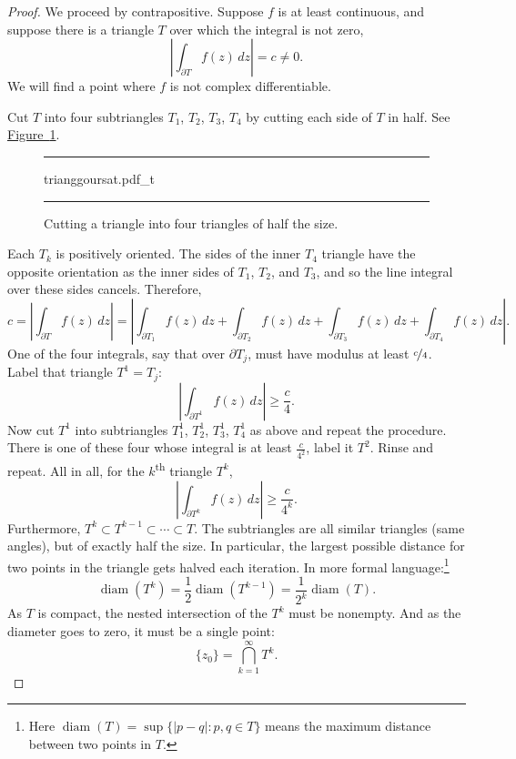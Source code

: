 \documentclass[12pt,openany]{book}
\newcommand{\sabs}[1]{\lvert {#1} \rvert}
\newcommand{\abs}[1]{\left\lvert {#1} \right\rvert}
\theoremstyle{plain}
\theoremstyle{remark}
\theoremstyle{definition}
\newenvironment{myfig}{%
\begin{figure}[h!t]
\noindent\rule{\textwidth}{0.5pt}\vspace{12pt}\par\centering}%
{\par\noindent\rule{\textwidth}{0.5pt}
\end{figure}}
\theoremstyle{exercise}
\theoremstyle{example}
\newcommand{\figureref}[1]{\hyperref[#1]{Figure~\ref*{#1}}}
\begin{document}
\begin{proof}
We proceed by contrapositive.
Suppose $f$ is at least continuous, and 
suppose there is a triangle $T$ over which the integral is not zero,
\begin{equation*}
\abs{\int_{\partial T} f(z) \, dz} = c \not= 0 .
\end{equation*}
We will find a point
where $f$ is not complex differentiable.

Cut $T$ into four subtriangles
$T_1$, $T_2$, $T_3$, $T_4$ by cutting each side of $T$ in half.  See
\figureref{fig:trianggoursat}.
\begin{myfig}
{trianggoursat.pdf_t}
\caption{Cutting a triangle into four triangles of half the size.%
\label{fig:trianggoursat}}
\end{myfig}

Each $T_k$ is positively oriented.
The sides of the inner $T_4$ triangle have the opposite
orientation as the inner sides of $T_1$, $T_2$, and $T_3$, and
so the line integral over these sides cancels.  Therefore,
\begin{equation*}
c = 
\abs{\int_{\partial T} f(z) \, dz }
=
\abs{\int_{\partial T_1} f(z) \, dz 
+
\int_{\partial T_2} f(z) \, dz 
+
\int_{\partial T_3} f(z) \, dz 
+
\int_{\partial T_4} f(z) \, dz } .
\end{equation*}
One of the four integrals, say that over $\partial T_j$,
must have modulus at least $\nicefrac{c}{4}$.  Label
that triangle $T^1 = T_j$:
\begin{equation*}
\abs{\int_{\partial T^1} f(z) \, dz } \geq \frac{c}{4} .
\end{equation*}
Now cut $T^1$ into subtriangles
$T_1^1$, $T_2^1$, $T_3^1$, $T_4^1$ as above and repeat the procedure.  There
is one of these four whose integral is at least $\frac{c}{4^2}$, label it
$T^2$.  Rinse and repeat.
All in all, for the $k$\textsuperscript{th} triangle $T^k$,
\begin{equation*}
\abs{\int_{\partial T^k} f(z) \, dz } \geq \frac{c}{4^k} .
\end{equation*}
Furthermore, $T^k \subset T^{k-1} \subset \cdots \subset T$.
The subtriangles are all similar triangles (same angles),
but of exactly half the size.
In particular,
the largest possible distance for two points in the triangle 
gets halved each iteration.
In more formal language:\footnote{%
Here $\operatorname{diam}(T)= \sup \{ \sabs{p-q} : p,q \in T \}$
means the maximum distance between two points in $T$.}
\begin{equation*}
\operatorname{diam}(T^k) =
\frac{1}{2} \operatorname{diam}(T^{k-1})
=
\frac{1}{2^k} \operatorname{diam}(T) .
\end{equation*}
As $T$ is compact, the nested intersection of the $T^k$ must be nonempty.
And as the diameter goes to zero, it must be a single point:
\begin{equation*}
\{ z_0 \} = \bigcap_{k=1}^\infty T^k .
\end{equation*}


\end{proof}
\end{document}
